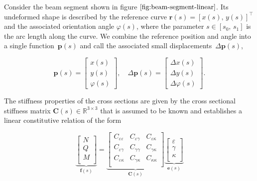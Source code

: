 Consider the beam segment shown in figure $\ref{fig:beam-segment-linear}$.
Its undeformed shape is described by the reference curve $\boldsymbol{r}(s) = \left[x(s),\,y(s)\right]^\intercal$ and the associated orientation angle $\varphi(s)$, where the parameter $s \in [s_0,\,s_1]$ is the arc length along the curve.
We combine the reference position and angle into a single function~$\boldsymbol{p}(s)$ and call the associated small displacements~$\Delta\boldsymbol{p}(s)$,

\begin{equation}
\boldsymbol{p}(s) = \begin{bmatrix}
x(s) \\
y(s) \\
\varphi(s)
\end{bmatrix},
\quad
\Delta\boldsymbol{p}(s) = \begin{bmatrix}
\Delta x(s) \\
\Delta y(s) \\
\Delta \varphi(s)
\end{bmatrix}.
\end{equation}

The stiffness properties of the cross sections are given by the cross sectional stiffness matrix $\boldsymbol{C}(s) \in \mathbb{R}^{3 \times 3}$ that is assumed to be known and establishes a linear constitutive relation of the form

\begin{equation}
\underbrace{
\begin{bmatrix}
N \\
Q \\
M \\
\end{bmatrix}
}_{\boldsymbol{f}(s)}
=
\underbrace{
\begin{bmatrix}
C_{\varepsilon\varepsilon} & C_{\varepsilon\gamma} & C_{\varepsilon\kappa} \\
C_{\varepsilon\gamma} & C_{\gamma\gamma} & C_{\gamma\kappa} \\
C_{\varepsilon\kappa} & C_{\gamma\kappa} & C_{\kappa\kappa} \\
\end{bmatrix}
}_{\boldsymbol{C}(s)}
\underbrace{
\begin{bmatrix}
\varepsilon \\
\gamma \\
\kappa \\
\end{bmatrix}
}_{\boldsymbol{e}(s)} \label{eq:section-stiffness-matrix}
\end{equation}

